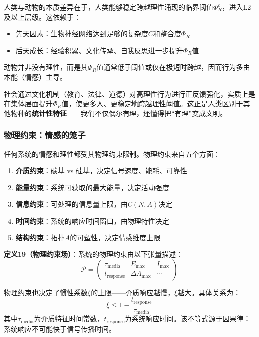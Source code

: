 \documentclass[12pt,a4paper]{article}
\theoremstyle{plain}
\begin{document}
人类与动物的本质差异在于，人类能够稳定跨越理性涌现的临界阈值$\Phi_R^c$，进入L2及以上层级。这依赖于：
\begin{itemize}
    \item 先天因素：生物神经网络达到足够的复杂度$C$和整合度$\Phi_R$
    \item 后天成长：经验积累、文化传承、自我反思进一步提升$\Phi_R$值
\end{itemize}

动物并非没有理性，而是其$\Phi_R$值通常低于阈值或仅在极短时跨越，因而行为多由本能（情感）主导。

社会通过文化机制（教育、法律、道德）对高理性行为进行正反馈强化，实质上是在集体层面提升$\Phi_R$值，使更多人、更稳定地跨越理性阈值。这正是人类区别于其他物种的\textbf{统计性特征}——我们不仅偶尔有理，还懂得把“有理”变成文明。

\subsubsection{物理约束：情感的笼子}

任何系统的情感和理性都受其物理约束限制。物理约束来自五个方面：

\begin{enumerate}
    \item \textbf{介质约束}：碳基 vs 硅基，决定信号速度、能耗、可靠性
    \item \textbf{能量约束}：系统可获取的最大能量，决定活动强度
    \item \textbf{信息约束}：可处理的信息量上限，由$C(N,A)$决定
    \item \textbf{时间约束}：系统的响应时间窗口，由物理特性决定
    \item \textbf{结构约束}：拓扑$A$的可塑性，决定情感维度上限
\end{enumerate}

\textbf{定义19（物理约束场）}：系统的物理约束由以下张量描述：
\begin{equation}
\mathcal{P} = \begin{pmatrix}
\tau_{\text{media}} & E_{\text{max}} & I_{\text{max}} \\
t_{\text{response}} & \Delta A_{\text{max}} & \cdots
\end{pmatrix}
\label{eq:physics_tensor2}
\end{equation}

物理约束也决定了惯性系数$\xi$的上限——介质响应越慢，$\xi$越大。具体关系为：
\begin{equation}
\xi \leq 1 - \frac{t_{\text{response}}}{\tau_{\text{media}}}
\label{eq:inertia_bound2}
\end{equation}
其中$\tau_{\text{media}}$为介质特征时间常数，$t_{\text{response}}$为系统响应时间。该不等式源于因果律：系统响应不可能快于信号传播时间。
\end{document}
